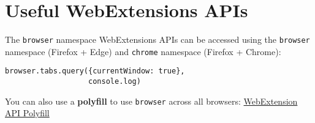 \documentclass[../index.tex]{subfiles}
\begin{document}

\renewcommand{\sectiontitle}{Useful WebExtensions APIs}
\section{\sectiontitle}

\renewcommand{\currenttitle}{The \texttt{browser} namespace}
\begin{frame}[fragile]{\currenttitle}
  WebExtensions APIs can be accessed using the \texttt{browser} namespace
  (Firefox + Edge) and \texttt{chrome} namespace (Firefox + Chrome): \\[1em]

  \begin{lstlisting}[language=ES6,basicstyle=\ttfamily\small]
browser.tabs.query({currentWindow: true}, 
                   console.log)
  \end{lstlisting}

  \vspace*{2em}

  You can also use a \textbf{polyfill} to use \texttt{browser} across all
  browsers:
  \href{https://github.com/mozilla/webextension-polyfill}
       {WebExtension API Polyfill}
\end{frame}

\end{document}
